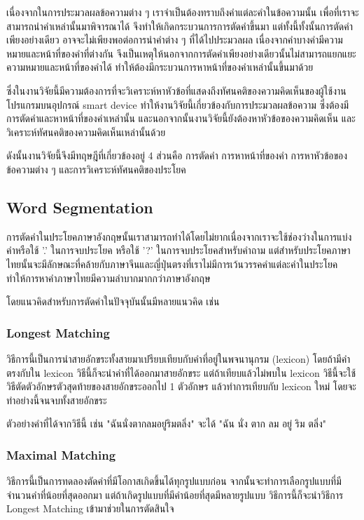
เนื่องจากในการประมวลผลข้อความต่าง ๆ เราจำเป็นต้องทราบถึงคำแต่ละคำในข้อความนั้น เพื่อที่เราจะสามารถนำคำเหล่านั้นมาพิจารณาได้ จึงทำให้เกิดกระบวนการการตัดคำขึ้นมา แต่ทั้งนี้ทั้งนั้นการตัดคำเพียงอย่างเดียว อาจจะไม่เพียงพอต่อการนำคำต่าง ๆ ที่ได้ไปประมวลผล เนื่องจากคำบางคำมีความหมายและหน้าที่ของคำที่ต่างกัน จึงเป็นเหตุให้นอกจากการตัดคำเพียงอย่างเดียวนั้นไม่สามารถแยกแยะความหมายและหน้าที่ของคำได้ ทำให้ต้องมีกระบวนการหาหน้าที่ของคำเหล่านั้นขึ้นมาด้วย

ซึ่งในงานวิจัยนี้มีความต้องการที่จะวิเคราะห์หาหัวข้อที่แสดงถึงทัศนคติของความคิดเห็นของผู้ใช้งานโปรแกรมบนอุปกรณ์ smart device ทำให้งานวิจัยนี้เกี่ยวข้องกับการประมวลผลข้อความ ซึ่งต้องมีการตัดคำและหาหน้าที่ของคำเหล่านั้น และนอกจากนั้นงานวิจัยนี้ยังต้องหาหัวข้อของความคิดเห็น และวิเคราะห์ทัศนคติของความคิดเห็นเหล่านั้นด้วย

ดังนั้นงานวิจัยนี้จึงมีทฤษฎีที่เกี่ยวข้องอยู่ 4 ส่วนคือ การตัดคำ การหาหน้าที่ของคำ การหาหัวข้อของข้อความต่าง ๆ และการวิเคราะห์ทัศนคติของประโยค
\subsection{Word Segmentation}
การตัดคำในประโยคภาษาอังกฤษนั้นเราสามารถทำได้โดยไม่ยากเนื่องจากเราจะใช้ช่องว่างในการแบ่งคำหรือใช้ '.' ในการจบประโยค หรือใช้ '?' ในการจบประโยคสำหรับคำถาม แต่สำหรับประโยคภาษาไทยนั้นจะมีลักษณะที่คล้ายกับภาษาจีนและญี่ปุ่นตรงที่เราไม่มีการเว้นวรรคคำแต่ละคำในประโยค ทำให้การหาคำภาษาไทยมีความลำบากมากกว่าภาษาอังกฤษ\cite{featurethaiwordseg}

โดยแนวคิดสำหรับการตัดคำในปัจจุบันนั้นมีหลายแนวคิด เช่น
\subsubsection{Longest Matching\cite{syllableseparator}}
วิธีการนี้เป็นการนำสายอักขระทั้งสายมาเปรียบเทียบกับคำที่อยู่ในพจนานุกรม (lexicon) โดยถ้ามีคำตรงกับใน lexicon วิธีนี้ก็จะนำคำที่ได้ออกมาสายอักขระ แต่ถ้าเทียบแล้วไม่พบใน lexicon วิธีนี้จะใช้วิธีตัดตัวอักษรตัวสุดท้ายของสายอักขระออกไป 1 ตัวอักษร แล้วทำการเทียบกับ lexicon ใหม่ โดยจะทำอย่างนี้จนจบทั้งสายอักขระ

ตัวอย่างคำที่ได้จากวิธีนี้ เช่น "ฉันนั่งตากลมอยู่ริมตลิ่ง" จะได้ "ฉัน นั่ง ตาก ลม อยู่ ริม ตลิ่ง"
\subsubsection{Maximal Matching\cite{wordsegforthai}}
วิธีการนี้เป็นการทดลองตัดคำที่มีโอกาสเกิดขึ้นได้ทุกรูปแบบก่อน จากนั้นจะทำการเลือกรูปแบบที่มีจำนวนคำที่น้อยที่สุดออกมา แต่ถ้าเกิดรูปแบบที่มีคำน้อยที่สุดมีหลายรูปแบบ วิธีการนี้ก็จะนำวิธีการ Longest Matching เข้ามาช่วยในการตัดสินใจ

